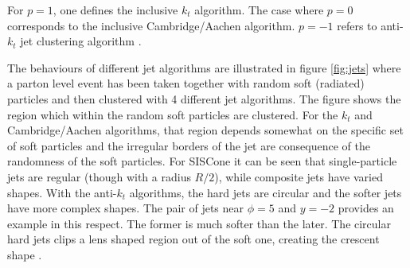 For $p = 1$, one defines the inclusive $k_t$ algorithm. The case where $p = 0$  corresponds to the inclusive Cambridge/Aachen algorithm. $p = -1$ refers to anti-$k_t$ jet clustering algorithm \citep{Cacciari:2008gp}.

The behaviours of different jet algorithms are illustrated in figure \ref{fig:jets} where a parton level event has been taken together with random soft (radiated) particles and then clustered with 4 different jet algorithms. The figure shows the region which within the random soft particles are clustered. For the $k_t$ and Cambridge/Aachen algorithms, that region depends somewhat on the specific set of soft particles and the irregular borders of the jet are consequence of the randomness of the soft particles. For SISCone it can be seen that single-particle jets are regular (though with a radius $R/2$), while composite jets have varied shapes. With the anti-$k_t$ algorithms, the hard jets are circular and the softer jets have more complex shapes. The pair of jets near $\phi = 5$ and $y = - 2$ provides an example in this respect. The former is much softer than the later. The circular hard jets clips a lens shaped region out of the soft one, creating the crescent shape \citep{Cacciari:2008gp}.                
%
%
%
%
%
%
%
%
%
%
%
%
%
%
%
%
%
%
%
%
%
%
%
%
%
%

%
%
%

